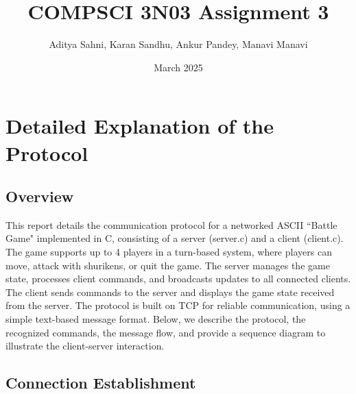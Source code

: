 \documentclass{article}
\title{COMPSCI 3N03 Assignment 3}
\author{Aditya Sahni, Karan Sandhu, Ankur Pandey, Manavi Manavi }
\date{March 2025}
\begin{document}
\maketitle

\section*{Detailed Explanation of the Protocol}

\subsection*{Overview}
This report details the communication protocol for a networked ASCII ``Battle Game" implemented in C, consisting of a server (server.c) and a client (client.c). The game supports up to 4 players in a turn-based system, where players can move, attack with shurikens, or quit the game. The server manages the game state, processes client commands, and broadcasts updates to all connected clients. The client sends commands to the server and displays the game state received from the server.
\newline
\newline
The protocol is built on TCP for reliable communication, using a simple text-based message format. Below, we describe the protocol, the recognized commands, the message flow, and provide a sequence diagram to illustrate the client-server interaction.

\subsection*{Connection Establishment}
\end{document}
